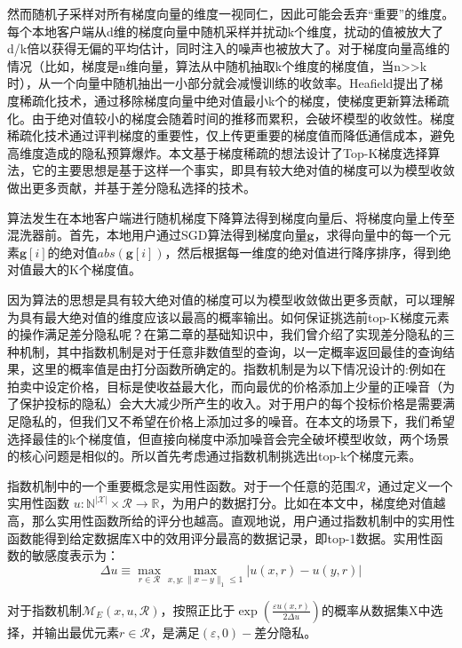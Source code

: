然而随机子采样对所有梯度向量的维度一视同仁，因此可能会丢弃“重要”的维度。每个本地客户端从d维的梯度向量中随机采样并扰动k个维度，扰动的值被放大了d/k倍以获得无偏的平均估计，同时注入的噪声也被放大了。对于梯度向量高维的情况（比如，梯度是n维向量，算法从中随机抽取k个维度的梯度值，当n>>k时），从一个向量中随机抽出一小部分就会减慢训练的收敛率。Heafield提出了梯度稀疏化技术，通过移除梯度向量中绝对值最小k个的梯度，使梯度更新算法稀疏化。由于绝对值较小的梯度会随着时间的推移而累积，会破坏模型的收敛性。梯度稀疏化技术通过评判梯度的重要性，仅上传更重要的梯度值而降低通信成本，避免高维度造成的隐私预算爆炸。本文基于梯度稀疏的想法设计了Top-K梯度选择算法，它的主要思想是基于这样一个事实，即具有较大绝对值的梯度可以为模型收敛做出更多贡献，并基于差分隐私选择的技术。

算法发生在本地客户端进行随机梯度下降算法得到梯度向量后、将梯度向量上传至混洗器前。首先，本地用户通过SGD算法得到梯度向量$\mathbf{g}$，求得向量中的每一个元素$\mathbf{g}[i]$的绝对值$a b s(\mathbf{g}[i])$，然后根据每一维度的绝对值进行降序排序，得到绝对值最大的K个梯度值。

因为算法的思想是具有较大绝对值的梯度可以为模型收敛做出更多贡献，可以理解为具有最大绝对值的维度应该以最高的概率输出。如何保证挑选前top-K梯度元素的操作满足差分隐私呢？在第二章的基础知识中，我们曾介绍了实现差分隐私的三种机制，其中指数机制是对于任意非数值型的查询，以一定概率返回最佳的查询结果，这里的概率值是由打分函数所确定的。指数机制是为以下情况设计的:例如在拍卖中设定价格，目标是使收益最大化，而向最优的价格添加上少量的正噪音（为了保护投标的隐私）会大大减少所产生的收入。对于用户的每个投标价格是需要满足隐私的，但我们又不希望在价格上添加过多的噪音。在本文的场景下，我们希望选择最佳的k个梯度值，但直接向梯度中添加噪音会完全破坏模型收敛，两个场景的核心问题是相似的。所以首先考虑通过指数机制挑选出top-k个梯度元素。

指数机制中的一个重要概念是实用性函数。对于一个任意的范围$\mathcal{R}$，通过定义一个实用性函数 $u: \mathbb{N}^{|\mathcal{X}|} \times \mathcal{R} \rightarrow \mathbb{R}$，为用户的数据打分。比如在本文中，梯度绝对值越高，那么实用性函数所给的评分也越高。直观地说，用户通过指数机制中的实用性函数能得到给定数据库X中的效用评分最高的数据记录，即top-1数据。实用性函数的敏感度表示为：
$$
\Delta u \equiv \max _{r \in \mathcal{R}} \max _{x, y:\|x-y\|_{1} \leq 1}|u(x, r)-u(y, r)|
$$

对于指数机制$\mathcal{M}_{E}(x, u, \mathcal{R})$，按照正比于$\exp \left(\frac{\varepsilon u(x, r)}{2 \Delta u}\right)$的概率从数据集X中选择，并输出最优元素$r \in \mathcal{R}$，是满足$(\varepsilon, 0)-$差分隐私。

